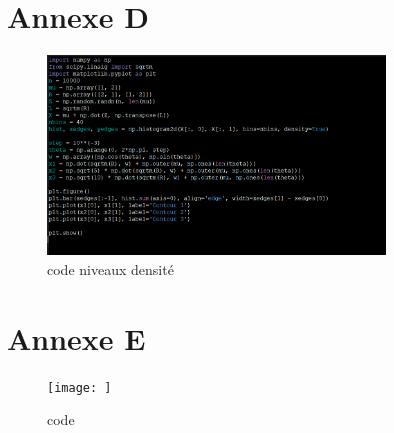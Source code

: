 \documentclass[a4paper]{article}
\begin{document}
\section{Annexe D}
\begin{figure}[h]
  \centering
  \includegraphics[width=0.8\textwidth]{8.png}
  \caption{code niveaux densité}
\end{figure}

\section{Annexe E}
\begin{figure}[h]
  \centering
  \texttt{[image: ]}
  \caption{code }
\end{figure}
\end{document}
